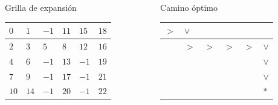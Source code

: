 \begin{frame}
\begin{footnotesize}
    
        \begin{columns}[t]
            \begin{column}{6cm}
                \centering
                Grilla de expansión\\
                \begin{tabularx}{6cm}{|X|X|X|X|X|X|}
                    \hline
                    $0$ & $1$ & $-1$ & $11$ & $15$ & $18$ \\
                    \hline
                    $2$ & $3$ & $5$ & $8$ & $12$ & $16$ \\
                    \hline
                    $4$ & $6$ & $-1$ & $13$ & $-1$ & $19$ \\
                    \hline
                    $7$ & $9$ & $-1$ & $17$ & $-1$ & $21$ \\
                    \hline
                    $10$ & $14$ & $-1$ & $20$ & $-1$ & $22$ \\
                    \hline
                \end{tabularx}
            \end{column}
            \begin{column}{6cm}
                \centering
                Camino óptimo
                \begin{tabularx}{6cm}{|X|X|X|X|X|X|}
                    \hline
                    $>$ & $\vee$ & \cellcolor{black} & & & \\
                    \hline
                    & $>$ & $>$ & $>$ & $>$ & $\vee$ \\
                    \hline
                    & & \cellcolor{black} &  & \cellcolor{black} & $\vee$ \\
                    \hline
                    & & \cellcolor{black} &  & \cellcolor{black} & $\vee$ \\
                    \hline
                    & & \cellcolor{black} & & \cellcolor{black} & $*$\\
                    \hline
                \end{tabularx}
            \end{column}
        \end{columns}
    \end{footnotesize}
\end{frame}


